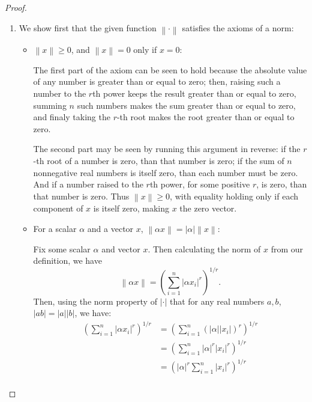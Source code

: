 \documentclass[12pt]{article}
\theoremstyle{definition}
\begin{document}
\begin{proof}
	\begin{enumerate}[label=(\roman*)]
		\item We show first that the given function $\left \lVert { \cdot } \right \lVert $ satisfies the axioms of a norm: 
		\begin{itemize}
			\item $\left \lVert { x } \right \lVert \geq 0$, and $\left \lVert { x } \right \lVert = 0 $ only if $x = 0$: \par The first part of the axiom can be seen to hold because the absolute value of any number is greater than or equal to zero; then, raising such a number to the $r$th power keeps the result greater than or equal to zero, summing $n$ such numbers makes the sum greater than or equal to zero, and finaly taking the $r$-th root makes the root greater than or equal to zero.
				\par The second part may be seen by running this argument in reverse: if the $r$-th root of a number is zero, than that number is zero; if the sum of $n$ nonnegative real numbers is itself zero, than each number must be zero. And if a number raised to the $r$th power, for some positive $r$, is zero, than that number is zero. Thus $\left \lVert { x } \right \lVert \geq 0$, with equality holding only if each component of $x$ is itself zero, making $x$ the zero vector.
			\item For a scalar $\alpha $ and a vector $x$, $\left \lVert { \alpha x } \right \lVert = \left \lvert { \alpha } \right \lvert \left \lVert { x } \right \lVert $: \par Fix some scalar $\alpha$ and vector $x$. Then calculating the norm of $x$ from our definition, we have \[ \left \lVert { \alpha x } \right \lVert = \left (\sum_{i=1}^n \left \lvert { \alpha x_i } \right \lvert^r \right )^{1/r}.\] Then, using the norm property of $\lvert \cdot \rvert$ that for any real numbers $a, b$, $\left \lvert { ab } \right \lvert = \left \lvert { a } \right \lvert \left \lvert { b } \right \lvert $, we have:
				\begin{align*}
				\left( \sum_{i=1}^n \left \lvert { \alpha x_i } \right \lvert^r \right)^{1/r} &= \left( \sum_{i=1}^n \left ( \left \lvert { \alpha } \right \lvert \left \lvert { x_i } \right \lvert \right )^r \right)^{1/r}  \\
				&= \left( \sum_{i=1}^n \left \lvert { \alpha } \right \lvert^r \left \lvert { x_i } \right \lvert^r \right)^{1/r} \\
				&= \left( \left \lvert { \alpha } \right \lvert^r \sum_{i=1}^n \left \lvert { x_i } \right \lvert ^r \right)^{1/r}\\

\end{align*}
\end{itemize}
\end{enumerate}
\end{proof}
\end{document}
